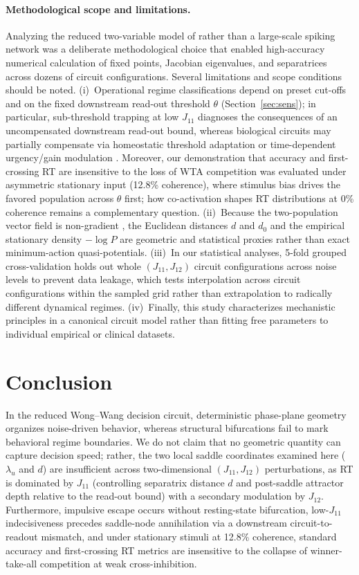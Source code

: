 \documentclass[11pt]{article}
\begin{document}
	\paragraph{Methodological scope and limitations.}
	Analyzing the reduced two-variable model of \citet{WongWang2006} rather than a large-scale spiking network \citep{Wang2002, Lam2022} was a deliberate methodological choice that enabled high-accuracy numerical calculation of fixed points, Jacobian eigenvalues, and separatrices across dozens of circuit configurations. Several limitations and scope conditions should be noted. (i)~Operational regime classifications depend on preset cut-offs and on the fixed downstream read-out threshold $\theta$ (Section~\ref{sec:sens}); in particular, sub-threshold trapping at low $J_{11}$ diagnoses the consequences of an uncompensated downstream read-out bound, whereas biological circuits may partially compensate via homeostatic threshold adaptation or time-dependent urgency/gain modulation \citep{Standage2011, Niyogi2013, Hanks2014, Standage2014}. Moreover, our demonstration that accuracy and first-crossing RT are insensitive to the loss of WTA competition was evaluated under asymmetric stationary input (12.8\% coherence), where stimulus bias drives the favored population across $\theta$ first; how co-activation shapes RT distributions at 0\% coherence remains a complementary question. (ii)~Because the two-population vector field is non-gradient \citep{YeLi2021}, the Euclidean distances $d$ and $d_0$ and the empirical stationary density $-\log P$ are geometric and statistical proxies rather than exact minimum-action quasi-potentials. (iii)~In our statistical analyses, 5-fold grouped cross-validation holds out whole $(J_{11},J_{12})$ circuit configurations across noise levels to prevent data leakage, which tests interpolation across circuit configurations within the sampled grid rather than extrapolation to radically different dynamical regimes. (iv)~Finally, this study characterizes mechanistic principles in a canonical circuit model rather than fitting free parameters to individual empirical or clinical datasets.
	
	\section{Conclusion}
	In the reduced Wong--Wang decision circuit, deterministic phase-plane geometry organizes noise-driven behavior, whereas structural bifurcations fail to mark behavioral regime boundaries. We do not claim that no geometric quantity can capture decision speed; rather, the two local saddle coordinates examined here ($\lambda_u$ and $d$) are insufficient across two-dimensional $(J_{11},J_{12})$ perturbations, as RT is dominated by $J_{11}$ (controlling separatrix distance $d$ and post-saddle attractor depth relative to the read-out bound) with a secondary modulation by $J_{12}$. Furthermore, impulsive escape occurs without resting-state bifurcation, low-$J_{11}$ indecisiveness precedes saddle-node annihilation via a downstream circuit-to-readout mismatch, and under stationary stimuli at 12.8\% coherence, standard accuracy and first-crossing RT metrics are insensitive to the collapse of winner-take-all competition at weak cross-inhibition.
	
\end{document}
